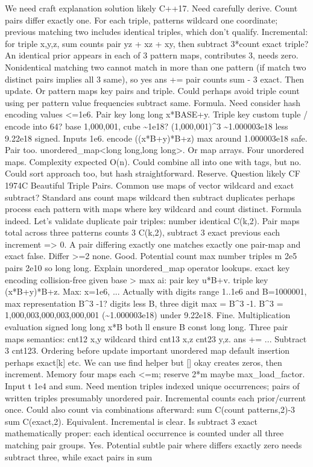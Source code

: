 \begin{decodedreasoningpanel}
  We need craft explanation solution likely C++17. Need carefully derive. Count pairs differ exactly one. For each triple, patterns wildcard one coordinate; previous matching two includes identical triples, which don't qualify. Incremental: for triple x,y,z, sum counts pair yz + xz + xy, then subtract 3*count exact triple? An identical prior appears in each of 3 pattern maps, contributes 3, needs zero. Nonidentical matching two cannot match in more than one pattern (if match two distinct pairs implies all 3 same), so yes ans += pair counts sum - 3 exact. Then update. Or pattern maps key pairs and triple. Could perhaps avoid triple count using per pattern value frequencies subtract same. Formula. Need consider hash encoding values \textless{}=1e6. Pair key long long x*BASE+y. Triple key custom tuple / encode into 64? base 1,000,001, cube \textasciitilde{}1e18? (1,000,001)\textasciicircum{}3 \textasciitilde{}1.000003e18 less 9.22e18 signed. Inputs 1e6. encode ((x*B+y)*B+z) max around 1.000003e18 safe. Pair too. unordered\_map\textless{}long long,long long\textgreater{}. Or map arrays. Four unordered maps. Complexity expected O(n). Could combine all into one with tags, but no. Could sort approach too, but hash straightforward. Reserve. Question likely CF 1974C Beautiful Triple Pairs. Common use maps of vector wildcard and exact subtract? Standard ans count maps wildcard then subtract duplicates perhaps process each pattern with maps where key wildcard and count distinct. Formula indeed. Let's validate duplicate pair triples: number identical C(k,2). Pair maps total across three patterns counts 3 C(k,2), subtract 3 exact previous each increment =\textgreater{} 0. A pair differing exactly one matches exactly one pair-map and exact false. Differ \textgreater{}=2 none. Good. Potential count max number triples m 2e5 pairs 2e10 so long long. Explain unordered\_map operator lookups. exact key encoding collision-free given base \textgreater{} max ai: pair key u*B+v. triple key (x*B+y)*B+z. Max: x=1e6, ... Actually with digits range 1..1e6 and B=1000001, max representation B\textasciicircum{}3 -1? digits less B, three digit max = B\textasciicircum{}3 -1. B\textasciicircum{}3 = 1,000,003,000,003,000,001 (\textasciitilde{}1.000003e18) under 9.22e18. Fine. Multiplication evaluation signed long long x*B both ll ensure B const long long. Three pair maps semantics: cnt12 x,y wildcard third cnt13 x,z cnt23 y,z. ans += ... Subtract 3 cnt123. Ordering before update important unordered map default insertion perhaps exact[k] etc. We can use find helper but [] okay creates zeros, then increment. Memory four maps each \textless{}=m; reserve 2*m maybe max\_load\_factor. Input t 1e4 and sum. Need mention triples indexed unique occurrences; pairs of written triples presumably unordered pair. Incremental counts each prior/current once. Could also count via combinations afterward: sum C(count patterns,2)-3 sum C(exact,2). Equivalent. Incremental is clear. Is subtract 3 exact mathematically proper: each identical occurrence is counted under all three matching pair groups. Yes. Potential subtle pair where differs exactly zero needs subtract three, while exact pairs in sum 
\end{decodedreasoningpanel}
